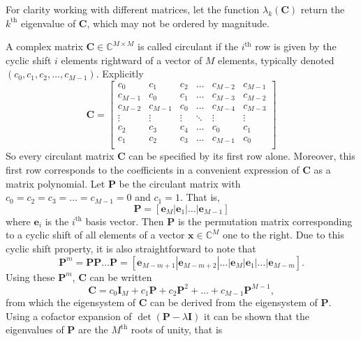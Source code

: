 \documentclass[letterpaper,12pt,oneside,final]{article}
\newcommand{\ve}[1]{\mathbf{#1}}           %
\newcommand{\m}[1]{\mathbf{#1}}               %
\newcommand{\field}[1]{\mathbb{#1}}
\newcommand{\Complex}{\field{C}}
\begin{document}
For clarity working with different matrices, let the function $\lambda_k(\m{C})$ return the $k^{\text{th}}$ eigenvalue of $\m{C}$, which may not be ordered by magnitude.

A complex matrix $\m{C} \in \Complex^{M \times M}$ is called circulant if the $i^{\text{th}}$ row is given by the cyclic shift $i$ elements rightward of a vector of $M$ elements, typically denoted $(c_0, c_1, c_2, \dots, c_{M-1})$. Explicitly
\begin{equation} \label{eq:explicitCirculant}
  \m{C} = \begin{bmatrix}
    c_0 & c_1 & c_2 & \dots & c_{M-2} & c_{M-1} \\
    c_{M-1} & c_0 & c_1 & \dots & c_{M-3} & c_{M-2} \\
    c_{M-2} & c_{M-1} & c_0 & \dots & c_{M-4} & c_{M-3} \\
    \vdots & \vdots & \vdots & \ddots & \vdots & \vdots \\
    c_2 & c_3 & c_4 & \dots & c_0 & c_1 \\
    c_1 & c_2 & c_3 & \dots & c_{M-1} & c_0 \\
    \end{bmatrix}
\end{equation}
So every circulant matrix $\m{C}$ can be specified by its first row alone. Moreover, this first row corresponds to the coefficients in a convenient expression of $\m{C}$ as a matrix polynomial. Let $\m{P}$ be the circulant matrix with $c_0 = c_2 = c_3 = \dots = c_{M-1} = 0$ and $c_1 = 1$. That is,
\begin{equation} \label{eq:pDef}
  \m{P} = [ \ve{e}_M | \ve{e}_1 | \dots | \ve{e}_{M-1} ]
\end{equation}
where $\ve{e}_i$ is the $i^{\text{th}}$ basis vector. Then $\m{P}$ is the permutation matrix corresponding to a cyclic shift of all elements of a vector $\ve{x} \in \Complex^M$ one to the right. Due to this cyclic shift property, it is also straightforward to note that
\begin{equation} \label{eq:powerPDef}
  \m{P}^m = \m{P} \m{P} \dots \m{P} = [ \ve{e}_{M-m+1} | \ve{e}_{M-m+2} | \dots | \ve{e}_M | \ve{e}_1 | \dots | \ve{e}_{M-m} ].
\end{equation}
Using these $\m{P}^m$, $\m{C}$ can be written
\begin{equation} \label{eq:circMatPol}
  \m{C} = c_0 \m{I}_M + c_1 \m{P} + c_2 \m{P}^2 + \dots + c_{M-1} \m{P}^{M-1},
\end{equation}
from which the eigensystem of $\m{C}$ can be derived from the eigensystem of $\m{P}$. Using a cofactor expansion of $\det (\m{P} - \lambda \m{I})$ it can be shown that the eigenvalues of $\m{P}$ are the $M^{\text{th}}$ roots of unity, that is
\end{document}
